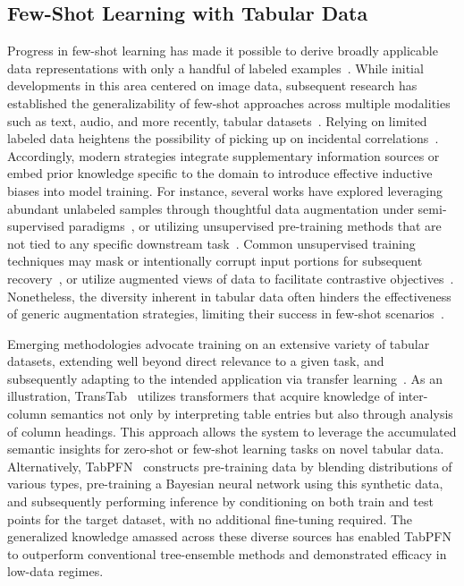 \subsection{Few-Shot Learning with Tabular Data} Progress in few-shot learning has made it possible to derive broadly applicable data representations with only a handful of labeled examples~\cite{chen2018closer}. While initial developments in this area centered on image data, subsequent research has established the generalizability of few-shot approaches across multiple modalities such as text, audio, and more recently, tabular datasets~\cite{majumder2022few,nam2023stunt,schick2021exploiting}. Relying on limited labeled data heightens the possibility of picking up on incidental correlations~\cite{bartlett2021deep}. Accordingly, modern strategies integrate supplementary information sources or embed prior knowledge specific to the domain to introduce effective inductive biases into model training. For instance, several works have explored leveraging abundant unlabeled samples through thoughtful data augmentation under semi-supervised paradigms~\cite{ucar2021subtab,yoon2020vime}, or utilizing unsupervised pre-training methods that are not tied to any specific downstream task~\cite{somepalli2021saint}. Common unsupervised training techniques may mask or intentionally corrupt input portions for subsequent recovery~\cite{arik2021tabnet,majmundar2022met}, or utilize augmented views of data to facilitate contrastive objectives~\cite{bahri2022scarf,chen2020simple}. Nonetheless, the diversity inherent in tabular data often hinders the effectiveness of generic augmentation strategies, limiting their success in few-shot scenarios~\cite{nam2023stunt}. 

Emerging methodologies advocate training on an extensive variety of tabular datasets, extending well beyond direct relevance to a given task, and subsequently adapting to the intended application via transfer learning~\cite{zhang2023generative,levin2022transfer,zhu2023xtab}. As an illustration, TransTab~\cite{wang2022transtab} utilizes transformers that acquire knowledge of inter-column semantics not only by interpreting table entries but also through analysis of column headings. This approach allows the system to leverage the accumulated semantic insights for zero-shot or few-shot learning tasks on novel tabular data. Alternatively, TabPFN~\cite{hollmann2022tabpfn} constructs pre-training data by blending distributions of various types, pre-training a Bayesian neural network using this synthetic data, and subsequently performing inference by conditioning on both train and test points for the target dataset, with no additional fine-tuning required. The generalized knowledge amassed across these diverse sources has enabled TabPFN to outperform conventional tree-ensemble methods and demonstrated efficacy in low-data regimes.

